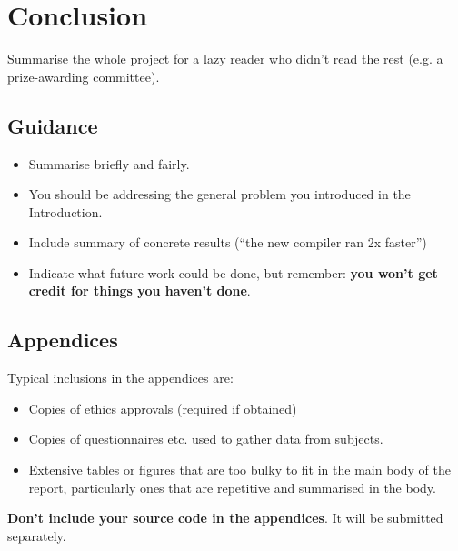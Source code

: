 \documentclass{l4proj}
\begin{document}
\chapter{Conclusion}    
Summarise the whole project for a lazy reader who didn't read the rest (e.g. a prize-awarding committee).
\section{Guidance}
\begin{itemize}
    \item
        Summarise briefly and fairly.
    \item
        You should be addressing the general problem you introduced in the
        Introduction.
    \item
        Include summary of concrete results (``the new compiler ran 2x
        faster'')
    \item
        Indicate what future work could be done, but remember: \textbf{you
        won't get credit for things you haven't done}.
\end{itemize}





\begin{appendices}

\chapter{Appendices}

Typical inclusions in the appendices are:

\begin{itemize}
\item
  Copies of ethics approvals (required if obtained)
\item
  Copies of questionnaires etc. used to gather data from subjects.
\item
  Extensive tables or figures that are too bulky to fit in the main body of
  the report, particularly ones that are repetitive and summarised in the body.
\end{itemize}

\textbf{Don't include your source code in the appendices}. It will be
submitted separately.

\end{appendices}





\end{document}
